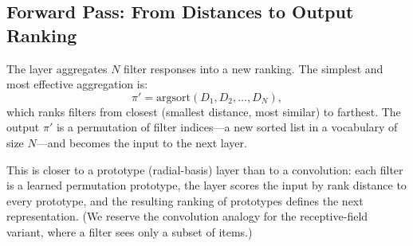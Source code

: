 \documentclass[12pt]{article}
\newcommand{\argsort}{\mathrm{argsort}}
\begin{document}
\subsection{Forward Pass: From Distances to Output Ranking}
The layer aggregates $N$ filter responses into a new ranking. The simplest and most effective aggregation is:
\begin{equation}
\pi' = \argsort(D_1, D_2, \dots, D_N),
\end{equation}
which ranks filters from closest (smallest distance, most similar) to farthest. The output $\pi'$ is a permutation of filter indices---a new sorted list in a vocabulary of size $N$---and becomes the input to the next layer.

This is closer to a prototype (radial-basis) layer than to a convolution: each filter is a learned permutation prototype, the layer scores the input by rank distance to every prototype, and the resulting ranking of prototypes defines the next representation. (We reserve the convolution analogy for the receptive-field variant, where a filter sees only a subset of items.)
\end{document}
